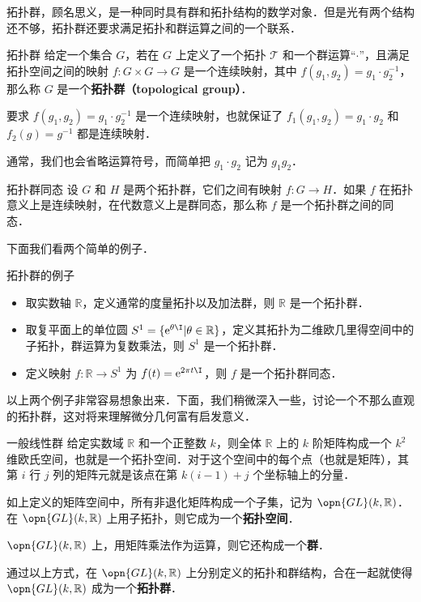 


拓扑群，顾名思义，是一种同时具有群和拓扑结构的数学对象．但是光有两个结构还不够，拓扑群还要求满足拓扑和群运算之间的一个联系．

\begin{definition}{拓扑群}
给定一个集合 $G$，若在 $G$ 上定义了一个拓扑 $\mathcal{T}$ 和一个群运算“$\cdot$”，且满足拓扑空间之间的映射 $f:G\times G\rightarrow G$ 是一个连续映射，其中 $f(g_1, g_2)=g_1\cdot g_2^{-1}$，那么称 $G$ 是一个\textbf{拓扑群（topological group）}．
\end{definition}

要求 $f(g_1, g_2)=g_1\cdot g_2^{-1}$ 是一个连续映射，也就保证了 $f_1(g_1, g_2)=g_1\cdot g_2$ 和 $f_2(g)=g^{-1}$ 都是连续映射．

通常，我们也会省略运算符号，而简单把 $g_1\cdot g_2$ 记为 $g_1g_2$．

\begin{definition}{拓扑群同态}
设 $G$ 和 $H$ 是两个拓扑群，它们之间有映射 $f:G\rightarrow H$．如果 $f$ 在拓扑意义上是连续映射，在代数意义上是群同态，那么称 $f$ 是一个拓扑群之间的同态．
\end{definition}

下面我们看两个简单的例子．

\begin{example}{拓扑群的例子}\label{TopGrp_ex1}
\begin{itemize}
\item 取实数轴 $\mathbb{R}$，定义通常的度量拓扑以及加法群，则 $\mathbb{R}$ 是一个拓扑群．
\item 取复平面上的单位圆 $S^1=\{\mathrm{e}^{\theta\I}|\theta\in\mathbb{R}\}$，定义其拓扑为二维欧几里得空间中的子拓扑，群运算为复数乘法，则 $S^1$ 是一个拓扑群．
\item 定义映射 $f:\mathbb{R}\rightarrow S^1$ 为 $f(t)=\mathrm{e}^{2\pi t\I}$，则 $f$ 是一个拓扑群同态．
\end{itemize}
\end{example}

以上两个例子非常容易想象出来．下面，我们稍微深入一些，讨论一个不那么直观的拓扑群，这对将来理解微分几何富有启发意义．

\begin{example}{一般线性群}\label{TopGrp_ex2}
给定实数域 $\mathbb{R}$ 和一个正整数 $k$，则全体 $\mathbb{R}$ 上的 $k$ 阶矩阵构成一个 $k^2$ 维欧氏空间，也就是一个拓扑空间．对于这个空间中的每个点（也就是矩阵），其第 $i$ 行 $j$ 列的矩阵元就是该点在第 $k(i-1)+j$ 个坐标轴上的分量．

如上定义的矩阵空间中，所有非退化矩阵构成一个子集，记为 $\opn{GL}(k, \mathbb{R})$．在 $\opn{GL}(k,\mathbb{R})$ 上用子拓扑，则它成为一个\textbf{拓扑空间}．

$\opn{GL}(k,\mathbb{R})$ 上，用矩阵乘法作为运算，则它还构成一个\textbf{群}．

通过以上方式，在 $\opn{GL}(k, \mathbb{R})$ 上分别定义的拓扑和群结构，合在一起就使得 $\opn{GL}(k, \mathbb{R})$ 成为一个\textbf{拓扑群}．
\end{example}

